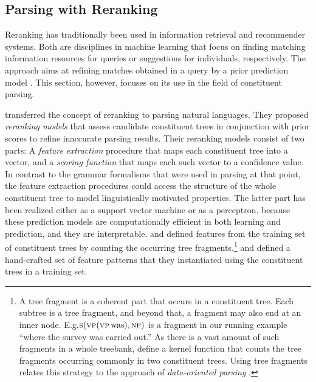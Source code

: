 \documentclass[../document.tex]{subfiles}
\begin{document}
    \subsection{Parsing with Reranking}\label{sec:references:reranking}
    Reranking has traditionally been used in information retrieval and recommender systems.
    Both are disciplines in machine learning that focus on finding matching information resources for queries or suggestions for individuals, respectively.
    The approach aims at refining matches obtained in a query by a prior prediction model \citep{carbonell1998use,adomavicius2009toward}.
    This section, however, focuses on its use in the field of constituent parsing.

     transferred the concept of reranking to parsing natural languages.
    They proposed \emph{reranking models} that assess candidate constituent trees in conjunction with prior scores to refine inaccurate parsing results.
    Their reranking models consist of two parts:
        A \emph{feature extraction} procedure that maps each constituent tree into a vector, and a \emph{scoring function} that maps each such vector to a confidence value.
    In contrast to the grammar formalisms that were used in parsing at that point, the feature extraction procedures could access the structure of the whole constituent tree to model linguistically motivated properties.
    The latter part has been realized either as a support vector machine or as a perceptron, because these prediction models are computationally efficient in both learning and prediction, and they are interpretable.
     and \citet{shen2003svm} defined features from the training set of constituent trees by counting the occurring tree fragments.\footnote{
        A tree fragment is a coherent part that occurs in a constituent tree.
        Each subtree is a tree fragment, and beyond that, a fragment may also end at an inner node.
        E.g.\@ \(\textsc{s} (\textsc{vp} (\textsc{vp}\, \text{was}), \textsc{np})\) is a fragment in our running example ``where the survey was carried out.''
        As there is a vast amount of such fragments in a whole treebank, \citet{collins2001convolution} define a kernel function that counts the tree fragments occurring commonly in two constituent trees.
        Using tree fragments relates this strategy to the approach of \emph{data-oriented parsing} \citep{Bod92}.
    }
     and \citet{charniak2005coarse} defined a hand-crafted set of feature patterns that they instantiated using the constituent trees in a training set.
\end{document}
